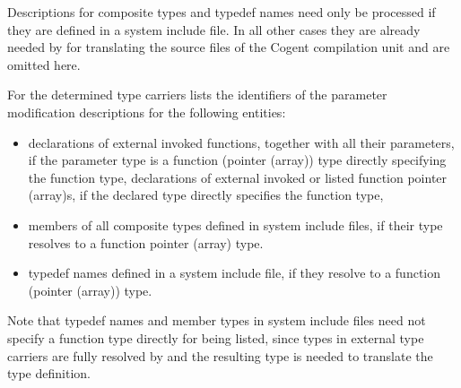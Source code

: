 Descriptions for composite types and typedef names need only be processed if they are defined in a system include
file. In all other cases they are already needed by  for translating the source files
of the Cogent compilation unit and are omitted here.

For the determined type carriers  lists the identifiers of 
the parameter modification descriptions for the following entities:
\begin{itemize}
\item declarations of external invoked functions, together with all their parameters, if the parameter
type is a function (pointer (array)) type directly specifying the function type,
\items declarations of external invoked or listed function pointer (array)s, if the declared type directly specifies
the function type,
\item members of all composite types defined in system include files, if their type resolves to a function pointer (array) type.
\item typedef names defined in a system include file, if they resolve to a function (pointer (array)) type.
\end{itemize}

Note that typedef names and member types in system include files need not specify a function type directly for being listed, 
since types in external type carriers are fully resolved by  and the resulting type is needed to translate 
the type definition.
